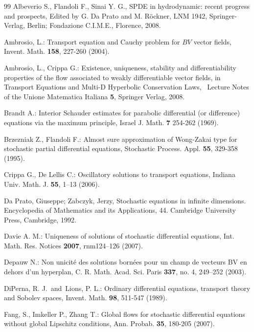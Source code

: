\documentclass[a4paper,11pt]{article}
\begin{document}
\begin{thebibliography}{99}
  Albeverio S., Flandoli F., Sinai Y. G., SPDE in hydrodynamic:
recent progress and prospects, Edited by G. Da Prato and M. R\"{o}ckner, LNM
1942, Springer-Verlag, Berlin; Fondazione C.I.M.E., Florence, 2008.

  Ambrosio, L.: Transport equation and Cauchy problem for $%
BV$ vector fields, Invent. Math. \textbf{158}, 227-260 (2004).

  Ambrosio, L., Crippa G.: Existence, uniqueness,
stability and differentiability properties of the flow associated to weakly
differentiable vector fields, in {Transport Equations and Multi-D Hyperbolic
Conservation Laws,} {\ Lecture Notes of the Unione Matematica Italiana}
\textbf{5}, Springer Verlag, 2008.


  Brandt A.: Interior Schauder estimates for parabolic
differential (or difference) equations via the maximum principle, Israel J.
Math. \textbf{7} 254-262 (1969).

  Brzezniak Z., Flandoli F.: Almost sure approximation of
Wong-Zakai type for stochastic partial differential equations, Stochastic
Process. Appl. \textbf{55}, 329-358 (1995).

  Crippa G., De Lellis C.: Oscillatory solutions to
transport equations, Indiana Univ. Math. J. \textbf{55}, 1--13 (2006).

  Da Prato, Giuseppe; Zabczyk, Jerzy, Stochastic equations
in infinite dimensions. Encyclopedia of Mathematics and its Applications,
44. Cambridge University Press, Cambridge, 1992.

  Davie A. M.: Uniqueness of solutions of stochastic differential
equations, Int. Math. Res. Notices \textbf{2007}, rnm124--126 (2007).

  Depauw N.: Non unicit\'{e} des solutions born\'{e}es pour un
champ de vecteurs BV en dehors d'un hyperplan, C. R. Math. Acad. Sci. Paris
\textbf{337}, no. 4, 249--252 (2003).

  DiPerna, R. J.\ and\ Lions, P. L.: Ordinary
differential equations, transport theory and Sobolev spaces, Invent. Math.
\textbf{98}, 511-547 (1989).

  Fang, S., Imkeller P., Zhang T.: Global flows for stochastic
differential equations without global Lipschitz conditions, Ann. Probab.
\textbf{35}, 180-205 (2007).


\end{thebibliography}
\end{document}
